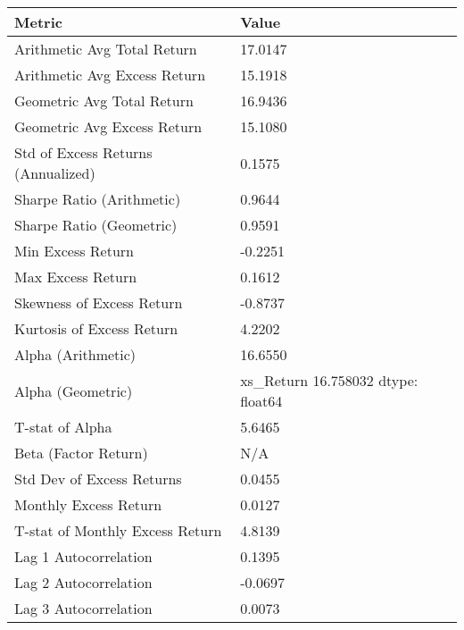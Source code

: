 \begin{tabular}{ll}
\toprule
Metric & Value \\
\midrule
Arithmetic Avg Total Return & 17.0147 \\
Arithmetic Avg Excess Return & 15.1918 \\
Geometric Avg Total Return & 16.9436 \\
Geometric Avg Excess Return & 15.1080 \\
Std of Excess Returns (Annualized) & 0.1575 \\
Sharpe Ratio (Arithmetic) & 0.9644 \\
Sharpe Ratio (Geometric) & 0.9591 \\
Min Excess Return & -0.2251 \\
Max Excess Return & 0.1612 \\
Skewness of Excess Return & -0.8737 \\
Kurtosis of Excess Return & 4.2202 \\
Alpha (Arithmetic) & 16.6550 \\
Alpha (Geometric) & xs_Return    16.758032
dtype: float64 \\
T-stat of Alpha & 5.6465 \\
Beta (Factor Return) & N/A \\
Std Dev of Excess Returns & 0.0455 \\
Monthly Excess Return & 0.0127 \\
T-stat of Monthly Excess Return & 4.8139 \\
Lag 1 Autocorrelation & 0.1395 \\
Lag 2 Autocorrelation & -0.0697 \\
Lag 3 Autocorrelation & 0.0073 \\
\bottomrule
\end{tabular}
